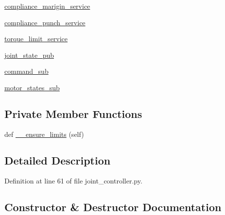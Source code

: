 \begin{DoxyCompactItemize}
\item 
\hyperlink{classdynamixel__controllers_1_1joint__controller_1_1_joint_controller_a91f03c9ccdece33a94f0bcb72c5bc582}{compliance\+\_\+marigin\+\_\+service}
\item 
\hyperlink{classdynamixel__controllers_1_1joint__controller_1_1_joint_controller_a65dbf0b3b19b26c009579e8853262276}{compliance\+\_\+punch\+\_\+service}
\item 
\hyperlink{classdynamixel__controllers_1_1joint__controller_1_1_joint_controller_a1555dcae38a12011ee6d11140bf6d6d7}{torque\+\_\+limit\+\_\+service}
\item 
\hyperlink{classdynamixel__controllers_1_1joint__controller_1_1_joint_controller_a05aab8618e98e299d5aaf86bd301229d}{joint\+\_\+state\+\_\+pub}
\item 
\hyperlink{classdynamixel__controllers_1_1joint__controller_1_1_joint_controller_a867bb1c6fc7084a725ff37a2c118d60d}{command\+\_\+sub}
\item 
\hyperlink{classdynamixel__controllers_1_1joint__controller_1_1_joint_controller_affc8be5e697a2ae71d284d8e0e59a4bd}{motor\+\_\+states\+\_\+sub}
\end{DoxyCompactItemize}
\subsection*{Private Member Functions}
\begin{DoxyCompactItemize}
\item 
def \hyperlink{classdynamixel__controllers_1_1joint__controller_1_1_joint_controller_aff8693c49d92c89f19a89a97fa029adb}{\+\_\+\+\_\+ensure\+\_\+limits} (self)
\end{DoxyCompactItemize}


\subsection{Detailed Description}


Definition at line 61 of file joint\+\_\+controller.\+py.



\subsection{Constructor \& Destructor Documentation}
\mbox{\label{classdynamixel__controllers_1_1joint__controller_1_1_joint_controller_ab17ccdf8f2f415bed15925ce6f798935}} 
